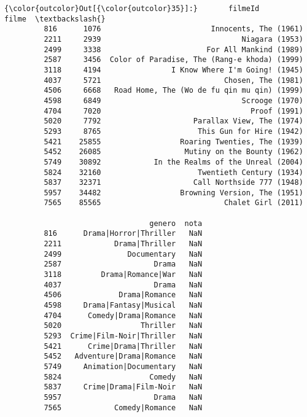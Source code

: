 \documentclass[11pt]{article}
\begin{document}
\begin{Verbatim}[commandchars=\\\{\}]
{\color{outcolor}Out[{\color{outcolor}35}]:}       filmeId                                         filme  \textbackslash{}
         816      1076                         Innocents, The (1961)   
         2211     2939                                Niagara (1953)   
         2499     3338                        For All Mankind (1989)   
         2587     3456  Color of Paradise, The (Rang-e khoda) (1999)   
         3118     4194                I Know Where I'm Going! (1945)   
         4037     5721                            Chosen, The (1981)   
         4506     6668   Road Home, The (Wo de fu qin mu qin) (1999)   
         4598     6849                                Scrooge (1970)   
         4704     7020                                  Proof (1991)   
         5020     7792                     Parallax View, The (1974)   
         5293     8765                      This Gun for Hire (1942)   
         5421    25855                  Roaring Twenties, The (1939)   
         5452    26085                   Mutiny on the Bounty (1962)   
         5749    30892            In the Realms of the Unreal (2004)   
         5824    32160                      Twentieth Century (1934)   
         5837    32371                     Call Northside 777 (1948)   
         5957    34482                  Browning Version, The (1951)   
         7565    85565                            Chalet Girl (2011)   
         
                                 genero  nota  
         816      Drama|Horror|Thriller   NaN  
         2211            Drama|Thriller   NaN  
         2499               Documentary   NaN  
         2587                     Drama   NaN  
         3118         Drama|Romance|War   NaN  
         4037                     Drama   NaN  
         4506             Drama|Romance   NaN  
         4598     Drama|Fantasy|Musical   NaN  
         4704      Comedy|Drama|Romance   NaN  
         5020                  Thriller   NaN  
         5293  Crime|Film-Noir|Thriller   NaN  
         5421      Crime|Drama|Thriller   NaN  
         5452   Adventure|Drama|Romance   NaN  
         5749     Animation|Documentary   NaN  
         5824                    Comedy   NaN  
         5837     Crime|Drama|Film-Noir   NaN  
         5957                     Drama   NaN  
         7565            Comedy|Romance   NaN  
\end{Verbatim}
            
\end{document}
